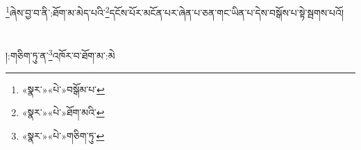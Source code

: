 \footnote{«སྣར་»«པེ་»བསྒོམ་པ་}ཞེས་བྱ་བ་ནི་:ཐོག་མ་མེད་པའི་\footnote{«སྣར་»«པེ་»ཐོག་མའི་}དངོས་པོར་མངོན་པར་ཞེན་པ་ཅན་གང་ཡིན་པ་དེས་བསྒོས་པ་སྟེ་སྦགས་པའོ།\chapter{ }།:གཅིག་ཏུ་ན་\footnote{«སྣར་»«པེ་»གཅིག་ཏུ་}འཁོར་བ་ཐོག་མ་:མེ